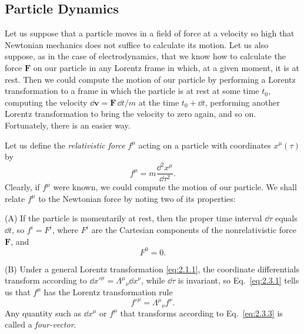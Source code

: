 
\subsection{Particle Dynamics}\label{sec:2.3}

Let us suppose that a particle moves in a field of force at a velocity so high
that Newtonian mechanics does not suffice to calculate its motion. Let us also
suppose, as in the case of electrodynamics, that we know how to calculate the
force \(\mathbf F\) on our particle in any Lorentz frame in which, at a given
moment, it is at rest. Then we could compute the motion of our particle by
performing a Lorentz transformation to a frame in which the particle is at rest
at some time \(t_0\), computing the velocity
\(\dd\mathbf v=\mathbf F\,\dd t/m\) at the time \(t_0+\dd t\), performing another
Lorentz transformation to bring the velocity to zero again, and so on.
Fortunately, there is an easier way.

Let us define the \emph{relativistic force} \(f^\mu\) acting on a particle with
coordinates \(x^\mu(\tau)\) by
\begin{equation}
  f^\mu=m\frac{\dd^2x^\mu}{\dd\tau^2}.
  \tag{2.3.1}\label{eq:2.3.1}
\end{equation}
Clearly, if \(f^\mu\) were known, we could compute the motion of our particle.
We shall relate \(f^\mu\) to the Newtonian force by noting two of its properties:

\noindent(A) If the particle is momentarily at rest, then the proper time
interval \(\dd\tau\) equals \(\dd t\), so \(f^i=F^i\), where \(F^i\) are the
Cartesian components of the nonrelativistic force \(\mathbf F\), and
\begin{equation}
  F^0=0.
  \tag{2.3.2}\label{eq:2.3.2}
\end{equation}

\noindent(B) Under a general Lorentz transformation \eqref{eq:2.1.1}, the
coordinate differentials transform according to
\(\dd x'^\mu=\Lambda^\mu{}_\nu \dd x^\nu\), while \(\dd\tau\) is invariant, so
Eq.~\eqref{eq:2.3.1} tells us that \(f^\mu\) has the Lorentz transformation
rule
\begin{equation}
  f'^\mu=\Lambda^\mu{}_\nu f^\nu .
  \tag{2.3.3}\label{eq:2.3.3}
\end{equation}
Any quantity such as \(\dd x^\mu\) or \(f^\mu\) that transforms according to
Eq.~\eqref{eq:2.3.3} is called a \emph{four-vector}.

